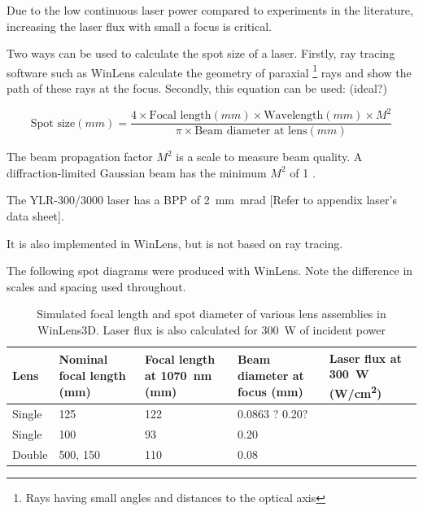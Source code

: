                 Due to the low continuous laser power compared to experiments in the literature, increasing the laser flux with small a focus is critical.

                Two ways can be used to calculate the spot size of a laser. Firstly, ray tracing software such as WinLens calculate the geometry of paraxial \footnote{Rays having small angles and distances to the optical axis} rays and show the path of these rays at the focus. Secondly, this equation \cite{LaserSpotSize} can be used: (ideal?)
                
                \[
                \text{Spot size}(mm) = \frac{4 \times \text{Focal length}(mm) \times \text{Wavelength}(mm) \times M^2}{\pi \times \text{Beam diameter at lens}(mm)}
                \]

                The beam propagation factor $M^2$ is a scale to measure beam quality. A diffraction-limited Gaussian beam has the minimum $M^2$ of 1 \cite{hechtUnderstandingLasersEntry2019}. 
                
                The YLR-300/3000 laser has a BPP of \qty{2}{mm.mrad} [Refer to appendix laser's data sheet].

                
                
                It is also implemented in WinLens, but is not based on ray tracing.

                The following spot diagrams were produced with WinLens. Note the difference in scales and spacing used throughout.

            

                \begin{table}[!ht]
                    \centering
                    \caption{Simulated focal length and spot diameter of various lens assemblies in WinLens3D. Laser flux is also calculated for \qty{300}{W} of incident power}
                    \label{tab:laser flux}
                    \begin{tabularx}{\textwidth}{@{}lX<{\raggedright}X<{\raggedright}X<{\raggedright}X<{\raggedright}@{}}
                    \toprule
                    Lens & Nominal focal length (\unit{mm}) & Focal length at \qty{1070}{nm} (\unit{mm})& Beam diameter at focus (\unit{mm}) & Laser flux at \qty{300}{W} (\unit{W/cm^2}) \\ \midrule
                    Single & 125           &  122   &    0.0863 ?  0.20?     &  \\
                    Single & 100           &  93   &    0.20   &  \\
                    Double & 500, 150      &  110    &    0.08   &  \\
                    \bottomrule
                    \end{tabularx}
                \end{table}


